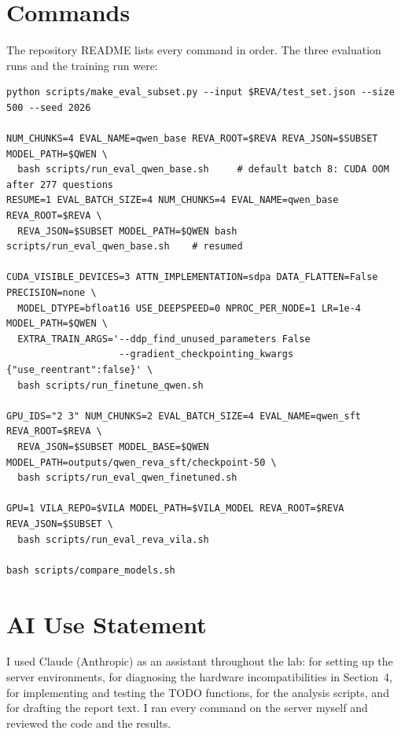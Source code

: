 \documentclass[11pt]{article}
\begin{document}
\section{Commands}
\label{sec:commands}

The repository README lists every command in order. The three evaluation runs and the training run were:

{\footnotesize
\begin{verbatim}
python scripts/make_eval_subset.py --input $REVA/test_set.json --size 500 --seed 2026

NUM_CHUNKS=4 EVAL_NAME=qwen_base REVA_ROOT=$REVA REVA_JSON=$SUBSET MODEL_PATH=$QWEN \
  bash scripts/run_eval_qwen_base.sh     # default batch 8: CUDA OOM after 277 questions
RESUME=1 EVAL_BATCH_SIZE=4 NUM_CHUNKS=4 EVAL_NAME=qwen_base REVA_ROOT=$REVA \
  REVA_JSON=$SUBSET MODEL_PATH=$QWEN bash scripts/run_eval_qwen_base.sh    # resumed

CUDA_VISIBLE_DEVICES=3 ATTN_IMPLEMENTATION=sdpa DATA_FLATTEN=False PRECISION=none \
  MODEL_DTYPE=bfloat16 USE_DEEPSPEED=0 NPROC_PER_NODE=1 LR=1e-4 MODEL_PATH=$QWEN \
  EXTRA_TRAIN_ARGS='--ddp_find_unused_parameters False
                    --gradient_checkpointing_kwargs {"use_reentrant":false}' \
  bash scripts/run_finetune_qwen.sh

GPU_IDS="2 3" NUM_CHUNKS=2 EVAL_BATCH_SIZE=4 EVAL_NAME=qwen_sft REVA_ROOT=$REVA \
  REVA_JSON=$SUBSET MODEL_BASE=$QWEN MODEL_PATH=outputs/qwen_reva_sft/checkpoint-50 \
  bash scripts/run_eval_qwen_finetuned.sh

GPU=1 VILA_REPO=$VILA MODEL_PATH=$VILA_MODEL REVA_ROOT=$REVA REVA_JSON=$SUBSET \
  bash scripts/run_eval_reva_vila.sh

bash scripts/compare_models.sh
\end{verbatim}
}

\section*{AI Use Statement}

I used Claude (Anthropic) as an assistant throughout the lab: for setting up the server environments, for diagnosing the hardware incompatibilities in Section~4, for implementing and testing the TODO functions, for the analysis scripts, and for drafting the report text. I ran every command on the server myself and reviewed the code and the results.
\end{document}
